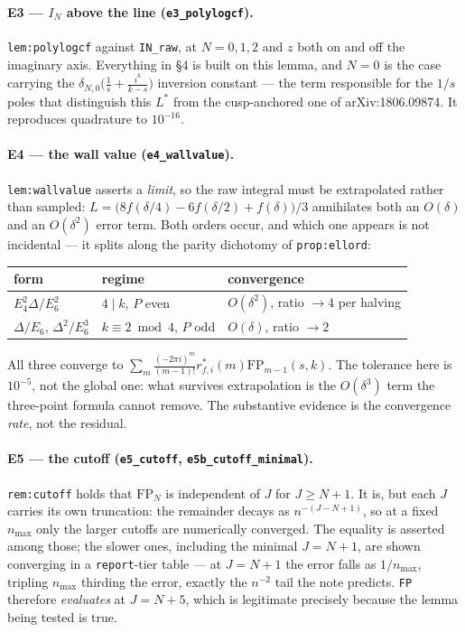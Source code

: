 \documentclass[11pt]{article}
\newcommand{\code}[1]{\texttt{#1}}
\begin{document}
\paragraph{E3 --- $I_N$ above the line (\code{e3\_polylogcf}).}
\code{lem:polylogcf} against \code{IN\_raw}, at $N=0,1,2$ and $z$ both on and off the imaginary
axis. Everything in \S4 is built on this lemma, and $N=0$ is the case carrying the
$\delta_{N,0}\big(\tfrac1s+\tfrac{i^k}{k-s}\big)$ inversion constant --- the term responsible
for the $1/s$ poles that distinguish this $L^*$ from the cusp-anchored one of
arXiv:1806.09874. It reproduces quadrature to $10^{-16}$.

\paragraph{E4 --- the wall value (\code{e4\_wallvalue}).}
\code{lem:wallvalue} asserts a \emph{limit}, so the raw integral must be extrapolated rather
than sampled: $L=\big(8f(\delta/4)-6f(\delta/2)+f(\delta)\big)/3$ annihilates both an
$O(\delta)$ and an $O(\delta^2)$ error term. Both orders occur, and which one appears is not
incidental --- it splits along the parity dichotomy of \code{prop:ellord}:
\begin{center}
\begin{tabular}{@{}lll@{}}
form & regime & convergence\\
\hline
$E_4^2\Delta/E_6^2$ & $4\mid k$, $P$ even & $O(\delta^2)$, ratio $\to4$ per halving\\
$\Delta/E_6$, $\Delta^2/E_6^3$ & $k\equiv2\bmod4$, $P$ odd & $O(\delta)$, ratio $\to2$\\
\end{tabular}
\end{center}
\noindent All three converge to $\sum_m\tfrac{(-2\pi i)^m}{(m-1)!}r^*_{f,i}(m)\mathrm{FP}_{m-1}(s,k)$.
The tolerance here is $10^{-5}$, not the global one: what survives extrapolation is the
$O(\delta^3)$ term the three-point formula cannot remove. The substantive evidence is the
convergence \emph{rate}, not the residual.

\paragraph{E5 --- the cutoff (\code{e5\_cutoff}, \code{e5b\_cutoff\_minimal}).}
\code{rem:cutoff} holds that $\mathrm{FP}_N$ is independent of $J$ for $J\ge N+1$. It is, but
each $J$ carries its own truncation: the remainder decays as $n^{-(J-N+1)}$, so at a fixed
$n_{\max}$ only the larger cutoffs are numerically converged. The equality is asserted among
those; the slower ones, including the minimal $J=N+1$, are shown converging in a
\code{report}-tier table --- at $J=N+1$ the error falls as $1/n_{\max}$, tripling $n_{\max}$
thirding the error, exactly the $n^{-2}$ tail the note predicts. \code{FP} therefore
\emph{evaluates} at $J=N+5$, which is legitimate precisely because the lemma being tested is
true.
\end{document}
